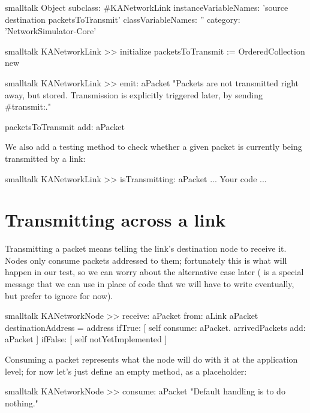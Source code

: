 \documentclass[10pt,twoside,english]{_support/latex/sbabook/sbabook}
\begin{document}
\begin{displaycode}{smalltalk}
Object subclass: #KANetworkLink
    instanceVariableNames: 'source destination packetsToTransmit'
    classVariableNames: ''
    category: 'NetworkSimulator-Core'
\end{displaycode}

\begin{displaycode}{smalltalk}
KANetworkLink >> initialize
    packetsToTransmit := OrderedCollection new
\end{displaycode}

\begin{displaycode}{smalltalk}
KANetworkLink >> emit: aPacket
    "Packets are not transmitted right away, but stored.
    Transmission is explicitly triggered later, by sending #transmit:."
	
    packetsToTransmit add: aPacket
\end{displaycode}

We also add a testing method to check whether a given packet is currently being transmitted by a link:

\begin{displaycode}{smalltalk}
KANetworkLink >> isTransmitting: aPacket
    ... Your code ...
\end{displaycode}
\section{Transmitting across a link}
Transmitting a packet means telling the link's destination node to receive it. Nodes only consume packets addressed to them; fortunately this is what will happen in our test, so we can worry about the alternative case later ( is a special message that we can use in place of code that we will have to write eventually, but prefer to ignore for now).

\begin{displaycode}{smalltalk}
KANetworkNode >> receive: aPacket from: aLink
    aPacket destinationAddress = address
        ifTrue: [
            self consume: aPacket.
            arrivedPackets add: aPacket ]
        ifFalse: [ self notYetImplemented ]
\end{displaycode}

Consuming a packet represents what the node will do with it at the application level; for now let's just define an empty  method, as a placeholder:

\begin{displaycode}{smalltalk}
KANetworkNode >> consume: aPacket
    "Default handling is to do nothing."
\end{displaycode}
\end{document}
